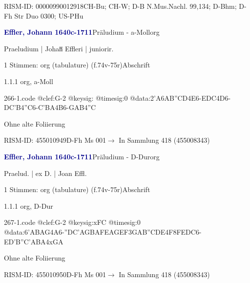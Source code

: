 \documentclass[twocolumn]{book}
\begin{document}
\par RISM-ID: 00000990012918\newline CH-Bu; CH-W; D-B  N.Mus.Nachl. 99,134; D-Bhm; D-Fh  Str Duo 0300; US-PHu
\par \vspace{7pt} \textcolor{darkblue}{\textbf{Effler, Johann  1640c-1711}}\hfillplus{\textbf{[266]}}\newline Präludium - a-Moll\newline org
\par \begin{itshape}[f.74v, at left:] Praeludium | Johan̅ Effleri | juniorir.\end{itshape} 
\par \textcolor{darkblue}{}  1 Stimmen: org (tabulature)  (f.74v-75r)\newline Abschrift
\par 1.1.1  org, a-Moll  
\begin{filecontents*}{266-1.code}
@clef:G-2
@keysig:
@timesig:0
@data:2'A{6AB''CD}4E6-{EDC}4D6-{DC'B}4''C6-{C'BA}4B6-{GAB}4''C
\end{filecontents*}
\newline
%
\par Ohne alte Foliierung
\par RISM-ID: 455010949\newline D-Fh  Ms 001\newline $\rightarrow$ In Sammlung 418 (455008343)
      
\par \vspace{7pt} \textcolor{darkblue}{\textbf{Effler, Johann  1640c-1711}}\hfillplus{\textbf{[267]}}\newline Präludium - D-Dur\newline org
\par \begin{itshape}[f.75r, at left:] Praelud. | ex D. | Joan Effl.\end{itshape} 
\par \textcolor{darkblue}{}  1 Stimmen: org (tabulature)  (f.74v-75r)\newline Abschrift
\par 1.1.1  org, D-Dur  
\begin{filecontents*}{267-1.code}
@clef:G-2
@keysig:xFC
@timesig:0
@data:{6'ABAG}4A6-{''DC'A}{GBAF}{EAGE}{F3GA}{B''CDE}4F{8FEDC}6-{ED'B}{''C'ABA}4xGA
\end{filecontents*}
\newline
%
\par Ohne alte Foliierung
\par RISM-ID: 455010950\newline D-Fh  Ms 001\newline $\rightarrow$ In Sammlung 418 (455008343)
      
\end{document}
